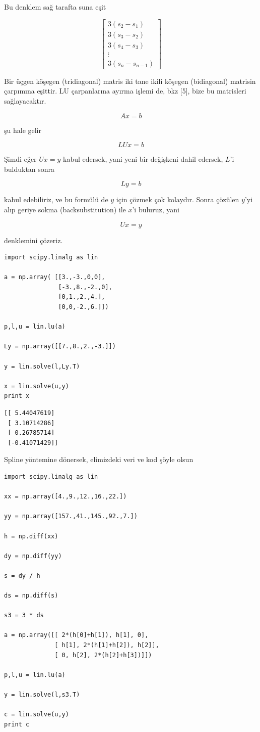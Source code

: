 \documentclass[12pt,fleqn]{article}\usepackage{../../common}
\begin{document}
Bu denklem sağ tarafta suna eşit 

$$ 
\left[\begin{array}{r}
3(s_2 - s_1) \\
3(s_3 - s_2) \\
3(s_4 - s_3) \\
\vdots \\
3(s_n - s_{n-1}) 
\end{array}\right]
 $$

 Bir üçgen köşegen (tridiagonal) matris iki tane ikili köşegen (bidiagonal)
 matrisin çarpımına eşittir. LU çarpanlarına ayırma işlemi de, bkz [5], bize
 bu matrisleri sağlayacaktır.

$$ Ax = b $$

şu hale gelir

$$ LUx = b $$

Şimdi eğer $Ux = y$ kabul edersek, yani yeni bir değişkeni dahil edersek,
$L$'i bulduktan sonra

$$ Ly = b $$

kabul edebiliriz, ve bu formülü de $y$ için çözmek çok kolaydır. Sonra
çözülen $y$'yi alıp geriye sokma (backsubstitution) ile $x$'i buluruz, yani 

$$ Ux = y $$ 

denklemini çözeriz. 

\begin{verbatim}
import scipy.linalg as lin

a = np.array( [[3.,-3.,0,0],
               [-3.,8.,-2.,0],
               [0,1.,2.,4.],
               [0,0,-2.,6.]])

p,l,u = lin.lu(a)

Ly = np.array([[7.,8.,2.,-3.]])

y = lin.solve(l,Ly.T)

x = lin.solve(u,y)
print x
\end{verbatim}

\begin{verbatim}
[[ 5.44047619]
 [ 3.10714286]
 [ 0.26785714]
 [-0.41071429]]
\end{verbatim}

Spline yöntemine dönersek, elimizdeki veri ve kod şöyle olsun

\begin{verbatim}
import scipy.linalg as lin

xx = np.array([4.,9.,12.,16.,22.])

yy = np.array([157.,41.,145.,92.,7.])

h = np.diff(xx)

dy = np.diff(yy)

s = dy / h

ds = np.diff(s)

s3 = 3 * ds

a = np.array([[ 2*(h[0]+h[1]), h[1], 0],
              [ h[1], 2*(h[1]+h[2]), h[2]],
              [ 0, h[2], 2*(h[2]+h[3])]])

p,l,u = lin.lu(a)

y = lin.solve(l,s3.T)

c = lin.solve(u,y)
print c
\end{verbatim}
\end{document}
